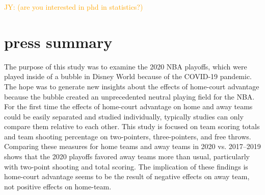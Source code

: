\documentclass[10pt]{article}
\newcommand{\jy}[1]{\textcolor{orange}{JY: (#1)}}
\begin{document}
\jy{are you interested in phd in statistics?}

\section*{press summary}
The purpose of this study was to examine the 2020 NBA playoffs, which
were played inside of a bubble in Disney World because of the COVID-19
pandemic. The hope was to generate new insights about the effects of
home-court advantage because the bubble created an unprecedented
neutral playing field for the NBA. For the first time the effects of
home-court advantage on home and away teams could be easily separated
and studied individually, typically studies can only compare them
relative to each other. This study is focused on team scoring totals
and team shooting percentage on two-pointers, three-pointers, and free
throws. Comparing these measures for home teams and away teams in 2020
vs. 2017--2019 shows that the 2020 playoffs favored away teams more
than usual, particularly with two-point shooting and total
scoring. The implication of these findings is home-court advantage
seems to be the result of negative effects on away team, not positive
effects on home-team.
\end{document}
